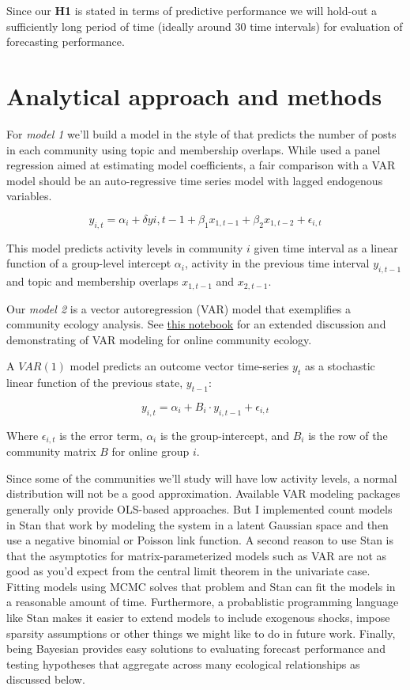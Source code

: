 \documentclass[12pt]{memoir}
\begin{document}
Since our \textbf{H1} is stated in terms of predictive performance we will hold-out a sufficiently long period of time (ideally around 30 time intervals) for evaluation of forecasting performance.  

\section{Analytical approach and methods}

For \emph{model 1} we'll build a model in the style of \citep{zhu_selecting_2014} that predicts the number of posts in each community using topic and membership overlaps.  While \citep{zhu_selecting_2014} used a panel regression aimed at estimating model coefficients, a fair comparison with a VAR model should be an auto-regressive time series model with lagged endogenous variables.

$$ y_{i,t} = \alpha_i + \delta y{i,t-1} + \beta_1 x_{1,t-1} + \beta_2 x_{1,t-2} + \epsilon_{i,t} $$

This model predicts activity levels in community $i$ given time interval as a linear function of a group-level intercept $\alpha_i$, activity in the previous time interval $y_{i,t-1}$ and topic and membership overlaps $x_{1,t-1}$ and $x_{2,t-1}$. 

Our \emph{model 2} is a vector autoregression (VAR) model that exemplifies a community ecology analysis.  See \href{https://teblunthuis.cc/outgoing/private/notebook_share/notebook-exported.html}{this notebook} for an extended discussion and demonstrating of VAR modeling for online community ecology.

A $VAR(1)$ model predicts an outcome vector time-series $y_t$ as a stochastic linear function of the previous state, $y_{t-1}$:

$$ y_{i,t} = \alpha_i + B_i \cdot y_{i,t-1} + \epsilon_{i,t} $$

Where $\epsilon_{i,t}$ is the error term, $\alpha_{i}$ is the group-intercept, and $B_i$ is the row of the community matrix $B$ for online group $i$.

Since some of the communities we'll study will have low activity levels, a normal distribution will not be a good approximation.  Available VAR modeling packages generally only provide OLS-based approaches. But I implemented count models in Stan that work by modeling the system in a latent Gaussian space and then use a negative binomial or Poisson link function. A second reason to use Stan is that the asymptotics for matrix-parameterized models such as VAR are not as good as you'd expect from the central limit theorem in the univariate case.  Fitting models using MCMC solves that problem and Stan can fit the models in a reasonable amount of time.  Furthermore, a probablistic programming language like Stan makes it easier to extend models to include exogenous shocks, impose sparsity assumptions or other things we might like to do in future work. Finally, being Bayesian provides easy solutions to evaluating forecast performance and testing hypotheses that aggregate across many ecological relationships as discussed below.
\end{document}
